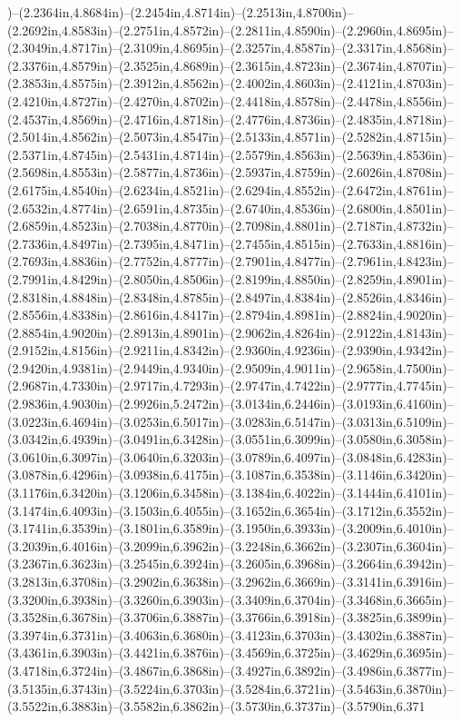 )--(2.2364in,4.8684in)--(2.2454in,4.8714in)--(2.2513in,4.8700in)--(2.2692in,4.8583in)--(2.2751in,4.8572in)--(2.2811in,4.8590in)--(2.2960in,4.8695in)--(2.3049in,4.8717in)--(2.3109in,4.8695in)--(2.3257in,4.8587in)--(2.3317in,4.8568in)--(2.3376in,4.8579in)--(2.3525in,4.8689in)--(2.3615in,4.8723in)--(2.3674in,4.8707in)--(2.3853in,4.8575in)--(2.3912in,4.8562in)--(2.4002in,4.8603in)--(2.4121in,4.8703in)--(2.4210in,4.8727in)--(2.4270in,4.8702in)--(2.4418in,4.8578in)--(2.4478in,4.8556in)--(2.4537in,4.8569in)--(2.4716in,4.8718in)--(2.4776in,4.8736in)--(2.4835in,4.8718in)--(2.5014in,4.8562in)--(2.5073in,4.8547in)--(2.5133in,4.8571in)--(2.5282in,4.8715in)--(2.5371in,4.8745in)--(2.5431in,4.8714in)--(2.5579in,4.8563in)--(2.5639in,4.8536in)--(2.5698in,4.8553in)--(2.5877in,4.8736in)--(2.5937in,4.8759in)--(2.6026in,4.8708in)--(2.6175in,4.8540in)--(2.6234in,4.8521in)--(2.6294in,4.8552in)--(2.6472in,4.8761in)--(2.6532in,4.8774in)--(2.6591in,4.8735in)--(2.6740in,4.8536in)--(2.6800in,4.8501in)--(2.6859in,4.8523in)--(2.7038in,4.8770in)--(2.7098in,4.8801in)--(2.7187in,4.8732in)--(2.7336in,4.8497in)--(2.7395in,4.8471in)--(2.7455in,4.8515in)--(2.7633in,4.8816in)--(2.7693in,4.8836in)--(2.7752in,4.8777in)--(2.7901in,4.8477in)--(2.7961in,4.8423in)--(2.7991in,4.8429in)--(2.8050in,4.8506in)--(2.8199in,4.8850in)--(2.8259in,4.8901in)--(2.8318in,4.8848in)--(2.8348in,4.8785in)--(2.8497in,4.8384in)--(2.8526in,4.8346in)--(2.8556in,4.8338in)--(2.8616in,4.8417in)--(2.8794in,4.8981in)--(2.8824in,4.9020in)--(2.8854in,4.9020in)--(2.8913in,4.8901in)--(2.9062in,4.8264in)--(2.9122in,4.8143in)--(2.9152in,4.8156in)--(2.9211in,4.8342in)--(2.9360in,4.9236in)--(2.9390in,4.9342in)--(2.9420in,4.9381in)--(2.9449in,4.9340in)--(2.9509in,4.9011in)--(2.9658in,4.7500in)--(2.9687in,4.7330in)--(2.9717in,4.7293in)--(2.9747in,4.7422in)--(2.9777in,4.7745in)--(2.9836in,4.9030in)--(2.9926in,5.2472in)--(3.0134in,6.2446in)--(3.0193in,6.4160in)--(3.0223in,6.4694in)--(3.0253in,6.5017in)--(3.0283in,6.5147in)--(3.0313in,6.5109in)--(3.0342in,6.4939in)--(3.0491in,6.3428in)--(3.0551in,6.3099in)--(3.0580in,6.3058in)--(3.0610in,6.3097in)--(3.0640in,6.3203in)--(3.0789in,6.4097in)--(3.0848in,6.4283in)--(3.0878in,6.4296in)--(3.0938in,6.4175in)--(3.1087in,6.3538in)--(3.1146in,6.3420in)--(3.1176in,6.3420in)--(3.1206in,6.3458in)--(3.1384in,6.4022in)--(3.1444in,6.4101in)--(3.1474in,6.4093in)--(3.1503in,6.4055in)--(3.1652in,6.3654in)--(3.1712in,6.3552in)--(3.1741in,6.3539in)--(3.1801in,6.3589in)--(3.1950in,6.3933in)--(3.2009in,6.4010in)--(3.2039in,6.4016in)--(3.2099in,6.3962in)--(3.2248in,6.3662in)--(3.2307in,6.3604in)--(3.2367in,6.3623in)--(3.2545in,6.3924in)--(3.2605in,6.3968in)--(3.2664in,6.3942in)--(3.2813in,6.3708in)--(3.2902in,6.3638in)--(3.2962in,6.3669in)--(3.3141in,6.3916in)--(3.3200in,6.3938in)--(3.3260in,6.3903in)--(3.3409in,6.3704in)--(3.3468in,6.3665in)--(3.3528in,6.3678in)--(3.3706in,6.3887in)--(3.3766in,6.3918in)--(3.3825in,6.3899in)--(3.3974in,6.3731in)--(3.4063in,6.3680in)--(3.4123in,6.3703in)--(3.4302in,6.3887in)--(3.4361in,6.3903in)--(3.4421in,6.3876in)--(3.4569in,6.3725in)--(3.4629in,6.3695in)--(3.4718in,6.3724in)--(3.4867in,6.3868in)--(3.4927in,6.3892in)--(3.4986in,6.3877in)--(3.5135in,6.3743in)--(3.5224in,6.3703in)--(3.5284in,6.3721in)--(3.5463in,6.3870in)--(3.5522in,6.3883in)--(3.5582in,6.3862in)--(3.5730in,6.3737in)--(3.5790in,6.371